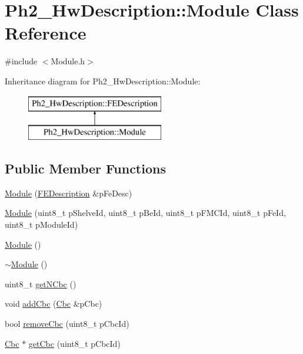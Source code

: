 \hypertarget{class_ph2___hw_description_1_1_module}{\section{Ph2\-\_\-\-Hw\-Description\-:\-:Module Class Reference}
\label{class_ph2___hw_description_1_1_module}
}


{\ttfamily \#include $<$Module.\-h$>$}

Inheritance diagram for Ph2\-\_\-\-Hw\-Description\-:\-:Module\-:\begin{figure}[H]
\begin{center}
\leavevmode
\includegraphics[height=2.000000cm]{class_ph2___hw_description_1_1_module}
\end{center}
\end{figure}
\subsection*{Public Member Functions}
\begin{DoxyCompactItemize}
\item 
\hyperlink{class_ph2___hw_description_1_1_module_a7429c4855bd0a17350b9dd47b760a676}{Module} (\hyperlink{class_ph2___hw_description_1_1_f_e_description}{F\-E\-Description} \&p\-Fe\-Desc)
\item 
\hyperlink{class_ph2___hw_description_1_1_module_acb5e5f17c946438f985c209563060f26}{Module} (uint8\-\_\-t p\-Shelve\-Id, uint8\-\_\-t p\-Be\-Id, uint8\-\_\-t p\-F\-M\-C\-Id, uint8\-\_\-t p\-Fe\-Id, uint8\-\_\-t p\-Module\-Id)
\item 
\hyperlink{class_ph2___hw_description_1_1_module_aaec7dd439bdf7a1db3f2136569a00125}{Module} ()
\item 
\hyperlink{class_ph2___hw_description_1_1_module_a8142f34ea2308ed78e8d0dbb042bc5f3}{$\sim$\-Module} ()
\item 
uint8\-\_\-t \hyperlink{class_ph2___hw_description_1_1_module_a8703442b1055c0c38b4157fc155ac084}{get\-N\-Cbc} ()
\item 
void \hyperlink{class_ph2___hw_description_1_1_module_ac2743d5056bc3053bf472e5fd94bbf14}{add\-Cbc} (\hyperlink{class_ph2___hw_description_1_1_cbc}{Cbc} \&p\-Cbc)
\item 
bool \hyperlink{class_ph2___hw_description_1_1_module_a0aa7c940311bd13a32fd4e0f251c2d27}{remove\-Cbc} (uint8\-\_\-t p\-Cbc\-Id)
\item 
\hyperlink{class_ph2___hw_description_1_1_cbc}{Cbc} $\ast$ \hyperlink{class_ph2___hw_description_1_1_module_a05ccbee9ca3eb8022e359b5e9dabe783}{get\-Cbc} (uint8\-\_\-t p\-Cbc\-Id)
\end{DoxyCompactItemize}
